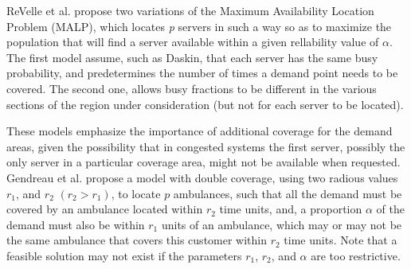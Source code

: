 ReVelle et al. \cite{revelle1989maximum}
propose two variations of the Maximum Availability Location Problem (MALP),
which locates \textit{p} servers
in such a way
so as to maximize the population
that will find a server available
within a given rellability value of $\alpha$.
The first model assume,
such as Daskin,
that each server has the same busy probability,
and predetermines the number of times a demand point needs to be covered.
The second one,
allows busy fractions
to be different in the various sections of the region under consideration
(but not for each server to be located).

These models
emphasize the importance of additional coverage
for the demand areas,
given the possibility that
in congested systems
the first server,
possibly
the only server in a particular coverage area,
might not be available when requested.
Gendreau et al. \cite{gendreau1997solving}
propose a model with double coverage,
using two radious values 
$r_1$, and $r_2$ $(r_2 > r_1)$,
to locate $p$ ambulances,
such that
all the demand must be covered by an ambulance
located within $r_2$ time units,
and,
a proportion $\alpha$ of the demand
must also be within $r_1$ units of an ambulance,
which may or may not be the same ambulance that
covers this customer within $r_2$ time units.
Note that a feasible solution may not exist
if the parameters $r_1$, $r_2$, and $\alpha$ are too restrictive.
